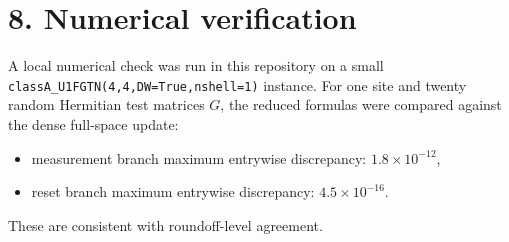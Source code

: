 \documentclass[11pt]{article}
\begin{document}
\section*{8. Numerical verification}

A local numerical check was run in this repository on a small
\texttt{classA\_U1FGTN(4,4,DW=True,nshell=1)} instance. For one site and
twenty random Hermitian test matrices $G$, the reduced formulas were compared
against the dense full-space update:
\begin{itemize}
\item measurement branch maximum entrywise discrepancy:
  $1.8 \times 10^{-12}$,
\item reset branch maximum entrywise discrepancy:
  $4.5 \times 10^{-16}$.
\end{itemize}
These are consistent with roundoff-level agreement.
\end{document}
